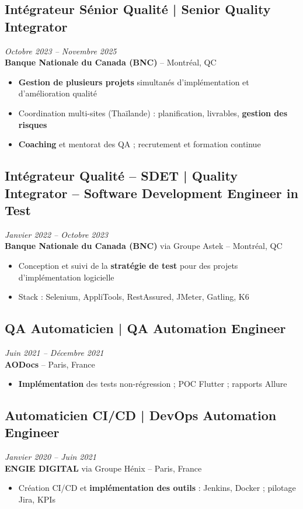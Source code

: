 \documentclass[11pt,a4paper]{article}
\begin{document}
\subsection*{Intégrateur Sénior Qualité | Senior Quality Integrator} \hfill \textit{Octobre 2023 -- Novembre 2025}\\
\textbf{Banque Nationale du Canada (BNC)} -- Montréal, QC
\begin{itemize}
    \item \textbf{Gestion de plusieurs projets} simultanés d'implémentation et d'amélioration qualité
    \item Coordination multi-sites (Thaïlande) : planification, livrables, \textbf{gestion des risques}
    \item \textbf{Coaching} et mentorat des QA ; recrutement et formation continue
\end{itemize}

\subsection*{Intégrateur Qualité -- SDET | Quality Integrator -- Software Development Engineer in Test} \hfill \textit{Janvier 2022 -- Octobre 2023}\\
\textbf{Banque Nationale du Canada (BNC)} via Groupe Astek -- Montréal, QC
\begin{itemize}
    \item Conception et suivi de la \textbf{stratégie de test} pour des projets d'implémentation logicielle
    \item Stack : Selenium, AppliTools, RestAssured, JMeter, Gatling, K6
\end{itemize}

\subsection*{QA Automaticien | QA Automation Engineer} \hfill \textit{Juin 2021 -- Décembre 2021}\\
\textbf{AODocs} -- Paris, France
\begin{itemize}
    \item \textbf{Implémentation} des tests non-régression ; POC Flutter ; rapports Allure
\end{itemize}

\subsection*{Automaticien CI/CD | DevOps Automation Engineer} \hfill \textit{Janvier 2020 -- Juin 2021}\\
\textbf{ENGIE DIGITAL} via Groupe Hénix -- Paris, France
\begin{itemize}
    \item Création CI/CD et \textbf{implémentation des outils} : Jenkins, Docker ; pilotage Jira, KPIs
\end{itemize}
\end{document}
